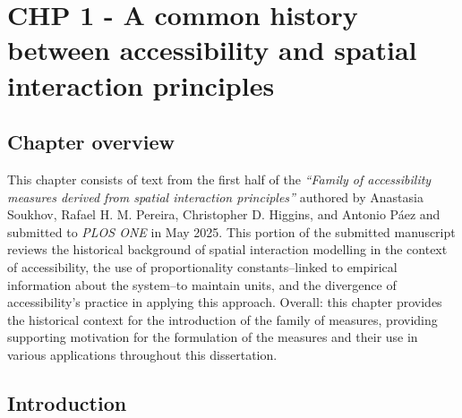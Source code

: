 \documentclass[
11pt, %
oneside, %
english, %
singlespacing, %
]{macthesis} %
\begin{document}
\chapter{CHP 1 - A common history between accessibility and spatial interaction principles}\label{chp-1---a-common-history-between-accessibility-and-spatial-interaction-principles}

\section{Chapter overview}\label{chapter-overview}

This chapter consists of text from the first half of the \emph{``Family of accessibility measures derived from spatial interaction principles''} authored by Anastasia Soukhov, Rafael H. M. Pereira, Christopher D. Higgins, and Antonio Páez and submitted to \emph{PLOS ONE} in May 2025. This portion of the submitted manuscript reviews the historical background of spatial interaction modelling in the context of accessibility, the use of proportionality constants--linked to empirical information about the system--to maintain units, and the divergence of accessibility's practice in applying this approach. Overall: this chapter provides the historical context for the introduction of the family of measures, providing supporting motivation for the formulation of the measures and their use in various applications throughout this dissertation.

\section{Introduction}\label{introduction}
\end{document}
